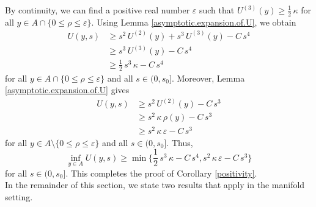 \documentclass[11pt]{amsart}
\theoremstyle{definition}
\begin{document}
By continuity, we can find a positive real number $\varepsilon$ such that $U^{(3)}(y) \geq \frac{1}{2} \, \kappa$ for all $y \in A \cap \{0 \leq \rho \leq \varepsilon\}$. Using Lemma \ref{asymptotic.expansion.of.U}, we obtain 
\begin{align*} 
U(y,s) 
&\geq s^2 \, U^{(2)}(y) + s^3 \, U^{(3)}(y) - C \, s^4 \\ 
&\geq s^3 \, U^{(3)}(y) - C \, s^4 \\ 
&\geq \frac{1}{2} \, s^3 \, \kappa - C \, s^4 
\end{align*}
for all $y \in A \cap \{0 \leq \rho \leq \varepsilon\}$ and all $s \in (0,s_0]$. Moreover, Lemma \ref{asymptotic.expansion.of.U} gives 
\begin{align*} 
U(y,s) 
&\geq s^2 \, U^{(2)}(y) - C \, s^3 \\ 
&\geq s^2 \, \kappa \, \rho(y) - C \, s^3 \\ 
&\geq s^2 \, \kappa \, \varepsilon - C \, s^3 
\end{align*}
for all $y \in A \setminus \{0 \leq \rho \leq \varepsilon\}$ and all $s \in (0,s_0]$. Thus, 
\[\inf_{y \in A} U(y,s) \geq \min \Big \{ \frac{1}{2} \, s^3 \, \kappa - C \, s^4,s^2 \, \kappa \, \varepsilon - C \, s^3 \Big \}\] 
for all $s \in (0,s_0]$. This completes the proof of Corollary \ref{positivity}. \\

In the remainder of this section, we state two results that apply in the manifold setting. 
\end{document}
